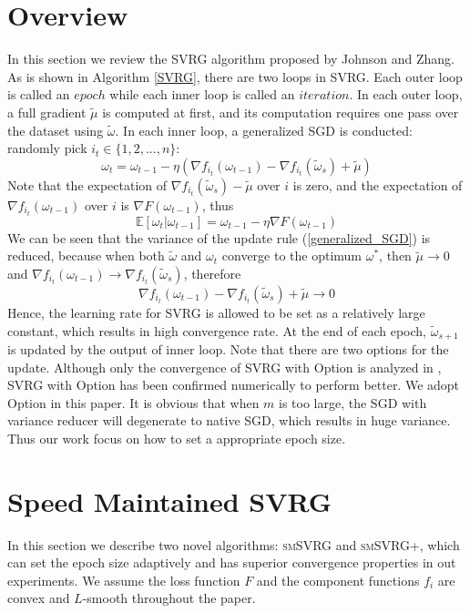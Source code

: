 \documentclass[conference]{IEEEtran}
\begin{document}
\section{Overview}
\label{svrg_review}
 In this section we review the SVRG algorithm proposed by Johnson and Zhang\citep{Johnson:9MAvkbgy}.  As is shown in Algorithm \ref{SVRG}, there are two loops in SVRG. Each outer loop is called an $epoch$ while each inner loop is called an $iteration$. In each outer loop, a full gradient $\tilde{\mu}$ is computed at first, and its computation requires one pass over the dataset using $\tilde{\omega}$. In each inner loop, a generalized SGD is conducted: randomly pick $i_t\in\{1, 2, ..., n\}$:
\begin{equation}
\label{generalized_SGD}
\omega_t = \omega_{t-1} - \eta(\nabla f_{i_t}(\omega_{t-1}) - \nabla f_{i_t}(\tilde{\omega}_s)+\tilde{\mu})
\end{equation}
Note that the expectation of $\nabla f_{i_t}(\tilde{\omega}_s)-\tilde{\mu}$ over $i$ is zero, and the expectation of $\nabla f_{i_t}(\omega_{t-1})$ over $i$ is $\nabla F(\omega_{t-1})$, thus 
$$
\mathbb{E}[\omega_{t} | \omega_{t-1}] = \omega_{t-1} - \eta\nabla F(\omega_{t-1})
$$
 We can be seen that the variance of the update rule (\ref{generalized_SGD}) is reduced, because when both $\tilde{\omega}$ and $\omega_t$ converge to the optimum $\omega^*$, then $\tilde{\mu}\rightarrow0$ and $\nabla f_{i_t}(\omega_{t-1})\rightarrow\nabla f_{i_t}(\tilde{\omega}_s)$, therefore
 $$\nabla f_{i_t}(\omega_{t-1}) - \nabla f_{i_t}(\tilde{\omega}_s)+\tilde{\mu}\rightarrow0$$
 Hence, the learning rate for SVRG is allowed to be set as a relatively large constant, which results in high convergence rate.
At the end of each epoch, $\tilde\omega_{s+1}$ is updated by the output of inner loop. Note that there are two options for the update. Although only the convergence of SVRG with Option \uppercase\expandafter{} is analyzed in \citep{Johnson:9MAvkbgy}, SVRG with Option \uppercase\expandafter{} has been confirmed numerically to perform better. We adopt Option \uppercase\expandafter{} in this paper. It is obvious that when $m$ is too large, the SGD with variance reducer will degenerate to native SGD, which results in huge variance. Thus our work focus on how to set a appropriate epoch size.
 
 \section{Speed Maintained SVRG}
 \label{mywork}
 In this section we describe two novel algorithms: \textsc{smSVRG} and \textsc{smSVRG+}, which can set the epoch size adaptively and has superior convergence properties in out experiments.
 We assume the loss function $F$ and the component functions $f_i$ are convex and $L$-smooth throughout the paper.
 
\end{document}
